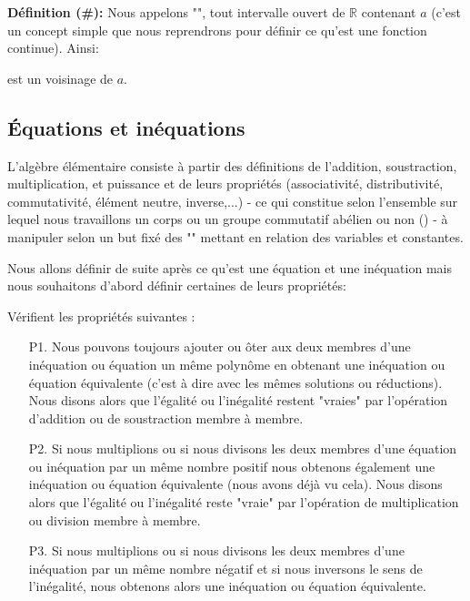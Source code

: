 	\textbf{Définition (\#\mydef):} Nous appelons "", tout intervalle ouvert de $\mathbb{R}$ contenant $a$ (c'est un concept simple que nous reprendrons pour définir ce qu'est une fonction continue). Ainsi:
	
	est un voisinage de $a$.

	\subsection{Équations et inéquations}
	L'algèbre élémentaire consiste à partir des définitions de l'addition, soustraction, multiplication, et puissance et de leurs propriétés (associativité, distributivité, commutativité, élément neutre, inverse,...) - ce qui constitue selon l'ensemble sur lequel nous travaillons un corps ou un groupe commutatif abélien ou non () - à manipuler selon un but fixé des "" mettant en relation des variables et constantes.

	Nous allons définir de suite après ce qu'est une équation et une inéquation mais nous souhaitons d'abord définir certaines de leurs propriétés:

	
	Vérifient les propriétés suivantes :
	\begin{enumerate}
		\item[P1.] Nous pouvons toujours ajouter ou ôter aux deux membres d'une inéquation ou équation un même polynôme en obtenant une inéquation ou équation équivalente (c'est à dire avec les mêmes solutions ou réductions). Nous disons alors que l'égalité ou l'inégalité restent "vraies" par l'opération d'addition ou de soustraction membre à membre.
		
		\item[P2.] Si nous multiplions ou si nous divisons les deux membres d'une équation ou inéquation par un même nombre positif nous obtenons également une inéquation ou équation équivalente (nous avons déjà vu cela). Nous disons alors que l'égalité ou l'inégalité reste "vraie" par l'opération de multiplication ou division membre à membre.
		
		\item[P3.] Si nous multiplions ou si nous divisons les deux membres d'une inéquation par un même nombre négatif et si nous inversons le sens de l'inégalité, nous obtenons alors une inéquation ou équation équivalente.
	\end{enumerate}
	
